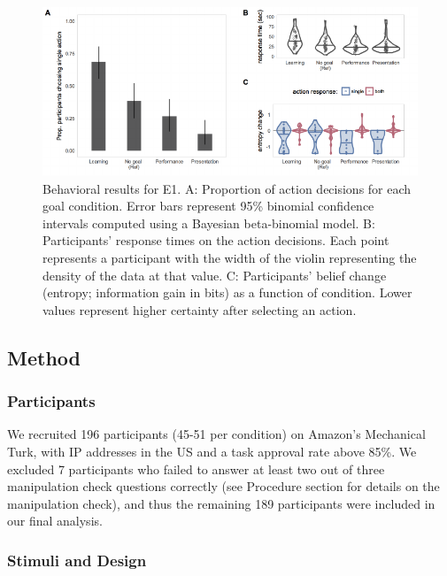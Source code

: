 \documentclass[10pt, letterpaper]{article}
\newenvironment{CodeChunk}{}{}
\begin{document}
\begin{CodeChunk}
\begin{figure}[tb]

{\centering \includegraphics[width=0.95\linewidth]{figs/e1_behav_results_plot-1} 

}

\caption[Behavioral results for E1]{Behavioral results for E1. A: Proportion of action decisions for each goal condition. Error bars represent 95\% binomial confidence intervals computed using a Bayesian beta-binomial model. B: Participants' response times on the action decisions. Each point represents a participant with the width of the violin representing the density of the data at that value. C: Participants' belief change (entropy; information gain in bits) as a function of condition. Lower values represent higher certainty after selecting an action.}\label{fig:e1_behav_results_plot}
\end{figure}
\end{CodeChunk}

\subsection{Method}\label{method}

\subsubsection{Participants}\label{participants}

We recruited 196 participants (45-51 per condition) on Amazon's
Mechanical Turk, with IP addresses in the US and a task approval rate
above 85\%. We excluded 7 participants who failed to answer at least two
out of three manipulation check questions correctly (see Procedure
section for details on the manipulation check), and thus the remaining
189 participants were included in our final analysis.

\subsubsection{Stimuli and Design}\label{stimuli-and-design}
\end{document}

